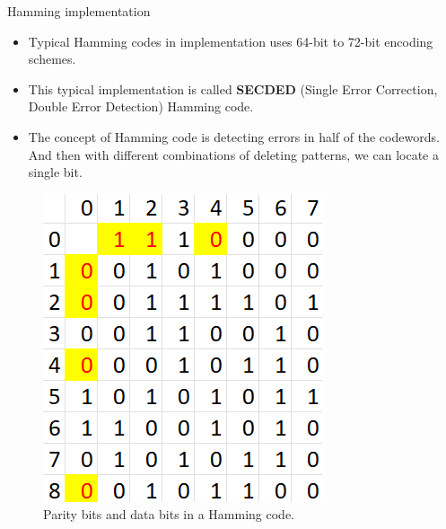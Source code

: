 \documentclass{beamer}
\begin{document}
\begin{frame}{Hamming implementation}
  \begin{itemize}
    \item Typical Hamming codes in implementation uses 64-bit to 72-bit encoding schemes.
    \item This typical implementation is called \textbf{SECDED} (Single Error Correction,
    Double Error Detection) Hamming code.
    \item The concept of Hamming code is detecting errors in half of the codewords.
      And then with different combinations of deleting patterns, we can locate a single
    bit.
  \end{itemize}
  \begin{figure}[htbp]
    \centerline{\includegraphics[scale = 0.6]{Images/Hamming_example.png}}
    \caption{Parity bits and data bits in a Hamming code.}
  \end{figure}
\end{frame}
\end{document}
